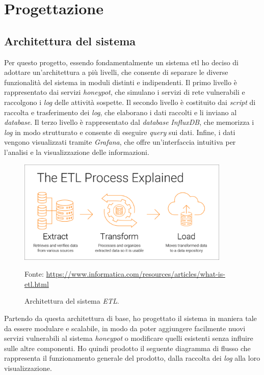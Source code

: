 \section{Progettazione}
\subsection{Architettura del sistema}
Per questo progetto, essendo fondamentalmente un sistema \gls{etl} ho deciso di adottare un'architettura a più livelli, che consente di separare le diverse funzionalità del sistema in moduli distinti e indipendenti.
Il primo livello è rappresentato dai servizi \textit{honeypot}, che simulano i servizi di rete vulnerabili e raccolgono i \textit{log} delle attività sospette.
Il secondo livello è costituito dai \textit{script} di raccolta e trasferimento dei \textit{log}, che elaborano i dati raccolti e li inviano al \textit{database}.
Il terzo livello è rappresentato dal \textit{database} \textit{InfluxDB}, che memorizza i \textit{log} in modo strutturato e consente di eseguire \textit{query} sui dati.
Infine, i dati vengono visualizzati tramite \textit{Grafana}, che offre un'interfaccia intuitiva per l'analisi e la visualizzazione delle informazioni.
\begin{figure}[H]
    \begin{center}
    \includegraphics[width=0.9\textwidth]{img/etl-process-explained-diagram.png}
    \caption{Architettura del sistema \textit{ETL}.}
    Fonte: \url{https://www.informatica.com/resources/articles/what-is-etl.html}
    \label{fig:etl-architecture}
    \end{center}
\end{figure}
Partendo da questa architettura di base, ho progettato il sistema in maniera tale da essere modulare e scalabile, in modo da poter aggiungere facilmente nuovi servizi vulnerabili al sistema \textit{honeypot} o modificare quelli esistenti senza influire sulle altre componenti.
Ho quindi prodotto il seguente diagramma di flusso che rappresenta il funzionamento generale del prodotto, dalla raccolta dei \textit{log} alla loro visualizzazione.
